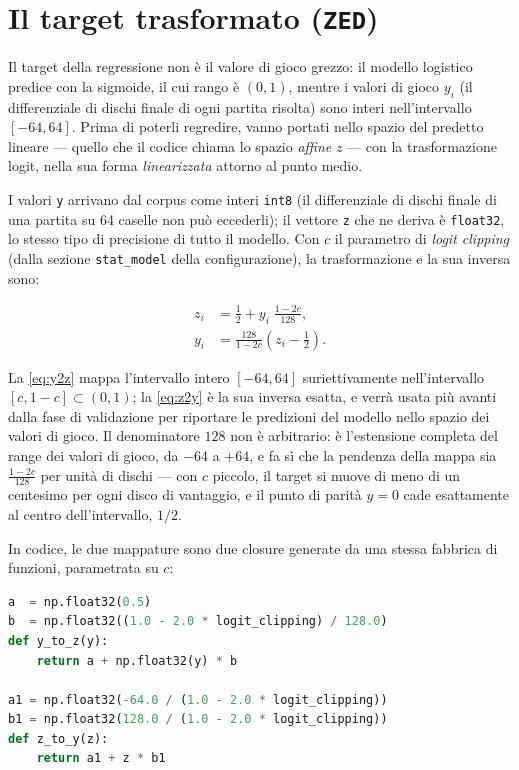 \section{Il target trasformato (\texttt{ZED})}

Il target della regressione non è il valore di gioco grezzo: il modello
logistico predice con la sigmoide, il cui rango è $(0, 1)$, mentre i valori di
gioco $y_i$ (il differenziale di dischi finale di ogni partita risolta) sono
interi nell'intervallo $[-64, 64]$. Prima di poterli regredire, vanno portati
nello spazio del predetto lineare — quello che il codice chiama lo spazio
\emph{affine} $z$ — con la trasformazione logit, nella sua forma
\emph{linearizzata} attorno al punto medio.

I valori \texttt{y} arrivano dal corpus come interi \texttt{int8} (il
differenziale di dischi finale di una partita su 64 caselle non può
eccederli); il vettore \texttt{z} che ne deriva è \texttt{float32}, lo stesso
tipo di precisione di tutto il modello. Con $c$ il parametro di \emph{logit
clipping} (dalla sezione \texttt{stat\_model} della configurazione), la
trasformazione e la sua inversa sono:

\begin{align}
  z_i &= \frac{1}{2} + y_i\;\frac{1 - 2c}{128} ,
  \label{eq:y2z}\\[4pt]
  y_i &= \frac{128}{1 - 2c}\left(z_i - \frac{1}{2}\right) .
  \label{eq:z2y}
\end{align}

La \eqref{eq:y2z} mappa l'intervallo intero $[-64, 64]$ suriettivamente
nell'intervallo $[c, 1-c] \subset (0, 1)$; la \eqref{eq:z2y} è la sua inversa
esatta, e verrà usata più avanti dalla fase di validazione per riportare le
predizioni del modello nello spazio dei valori di gioco. Il denominatore
$128$ non è arbitrario: è l'estensione completa del range dei valori di
gioco, da $-64$ a $+64$, e fa sì che la pendenza della mappa sia
$\frac{1-2c}{128}$ per unità di dischi — con $c$ piccolo, il target si
muove di meno di un centesimo per ogni disco di vantaggio, e il
punto di parità $y = 0$ cade esattamente al centro dell'intervallo, $1/2$.

In codice, le due
mappature sono due closure generate da una stessa fabbrica di funzioni,
parametrata su $c$:

\begin{lstlisting}[language=python, caption={Il cuore di \texttt{hlp\_zed\_fun\_factory}
(estratto).}]
a  = np.float32(0.5)
b  = np.float32((1.0 - 2.0 * logit_clipping) / 128.0)
def y_to_z(y):
    return a + np.float32(y) * b

a1 = np.float32(-64.0 / (1.0 - 2.0 * logit_clipping))
b1 = np.float32(128.0 / (1.0 - 2.0 * logit_clipping))
def z_to_y(z):
    return a1 + z * b1
\end{lstlisting}

